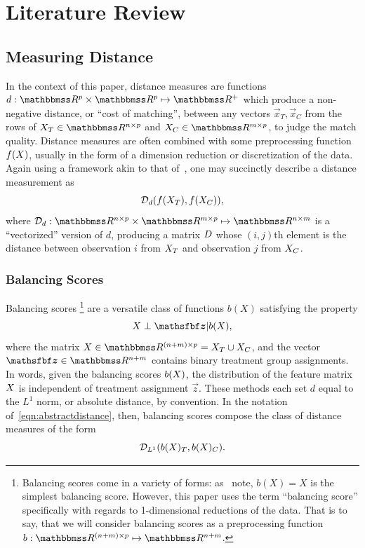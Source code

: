 \documentclass[11pt]{extarticle}
\begin{document}


\section{Literature Review}
\label{sec:litrev}


\subsection{Measuring Distance}

In the context of this paper, distance measures are functions $d: \reals^p \times \reals^p \mapsto \reals^+$ which produce a non-negative distance, or ``cost of matching'', between any vectors $\vec{x}_T, \vec{x}_C$ from the rows of $\mat{X}_T \in \reals^{n \times p}$ and $\mat{X}_C \in \reals^{m \times p}$, to judge the match quality. Distance measures are often combined with some preprocessing function $f(X)$, usually in the form of a dimension reduction or discretization of the data. Again using a framework akin to that of~\textcite{iacus_multivariate_2011}, one may succinctly describe a distance measurement as
\begin{equation}
  \mathcal{D}_d (f(X_T), f(X_C)), \label{eqn:abstractdistance}
\end{equation}
where $\mathcal{D}_d : \reals^{n \times p} \times \reals^{m \times p} \mapsto \reals^{n \times m}$ is a ``vectorized'' version of $d$, producing a matrix $D$ whose $(i, j)$th element is the distance between observation $i$ from $X_T$ and observation $j$ from $X_C$.


\subsubsection{Balancing Scores}

Balancing scores
\footnote{Balancing scores come in a variety of forms: as~\textcite{rosenbaum_central_1983} note, $b(X) = X$ is the simplest balancing score. However, this paper uses the term ``balancing score'' specifically with regards to 1-dimensional reductions of the data. That is to say, that we will consider balancing scores as a preprocessing function $b: \reals^{(n + m) \times p} \mapsto \reals^{n + m}$.}
\parencite{rosenbaum_central_1983} are a versatile class of functions $b(X)$ satisfying the property
\begin{equation}
  \mat{X} \perp \vec{z} | b(\mat{X}), \label{eqn:defbalancingscore}
\end{equation}
where the matrix $\mat{X} \in \reals^{(n + m) \times p} = \mat{X}_T \cup \mat{X}_C$, and the vector $\vec{z} \in \reals^{n + m}$ contains binary treatment group assignments.
In words, given the balancing scores $b(X)$, the distribution of the feature matrix $X$ is independent of treatment assignment $\vec{z}$. These methods each set $d$ equal to the $L^1$ norm, or absolute distance, by convention. In the notation of~\eqref{eqn:abstractdistance}, then, balancing scores compose the class of distance measures of the form
\begin{equation}
  \mathcal{D}_{L^1}(b(X)_T, b(X)_C).
\end{equation}
\end{document}
